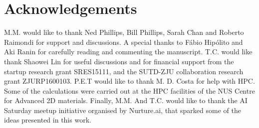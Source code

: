 \documentclass[5p]{elsarticle}
\begin{document}
\section{Acknowledgements}

M.M. would like to thank Ned Phillips, Bill Phillips, Sarah Chan and Roberto Raimondi for support and discussions. A special thanks to  F\'abio Hip\'olito and Aki Ranin for carefully reading and commenting the manuscript. T.C. would like thank Shaowei Lin for useful discussions and for financial support from the startup research grant
SRES15111, and the SUTD-ZJU collaboration research\\
grant ZJURP1600103. P.E.T would like to thank M. D. Costa for help with HPC. Some of the calculations were carried out at the HPC facilities of the NUS Centre for Advanced 2D materials. Finally, M.M. And T.C. would like to thank the AI Saturday meetup initiative organised by Nurture.ai, that sparked some of the ideas presented in this work.

\appendix
\end{document}
